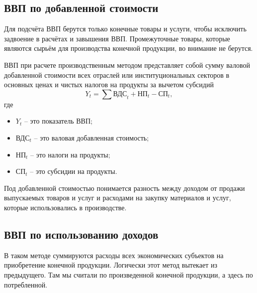 \documentclass[a4paper, 14pt]{extreport}
\numberwithin{equation}{section}
\numberwithin{equation}{section}
\begin{document}
	\subsection{ВВП по добавленной стоимости}
	Для подсчёта ВВП берутся только конечные товары и услуги, чтобы исключить задвоение в расчётах и завышения ВВП. Промежуточные товары, которые являются сырьём для производства конечной продукции, во внимание не берутся.
	
	ВВП при расчете производственным методом представляет собой сумму валовой добавленной стоимости всех отраслей или институциональных секторов в основных ценах и чистых налогов на продукты за вычетом субсидий
	\begin{equation}\label{gdp_prod}
		Y_t = \sum\text{ВДС}_t + \text{НП}_t - \text{СП}_t,
	\end{equation}
	где
	\begin{itemize}
		\item $Y_t$ -- это показатель ВВП;
		\item ВДС$_t$ -- это валовая добавленная стоимость;
		\item НП$_t$ -- это налоги на продукты;
		\item СП$_t$ -- это субсидии на продукты.
	\end{itemize}
	Под добавленной стоимостью понимается разность между доходом от продажи выпускаемых товаров и услуг и расходами на закупку материалов и услуг, которые использовались в производстве.
	  
	\subsection{ВВП по использованию доходов}
	В таком методе суммируются расходы всех экономических субъектов на приобретение конечной продукции. Логически этот метод вытекает из предыдущего. Там мы считали по произведенной конечной продукции, а здесь по потребленной.
	
\end{document}
